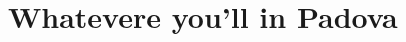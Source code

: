 \setcounter{chapter}{3}
\setcounter{section}{0}

\graphicspath{ {./chapters/3_lab_pd/figures/} }

\chapter{Whatevere you'll in Padova}
